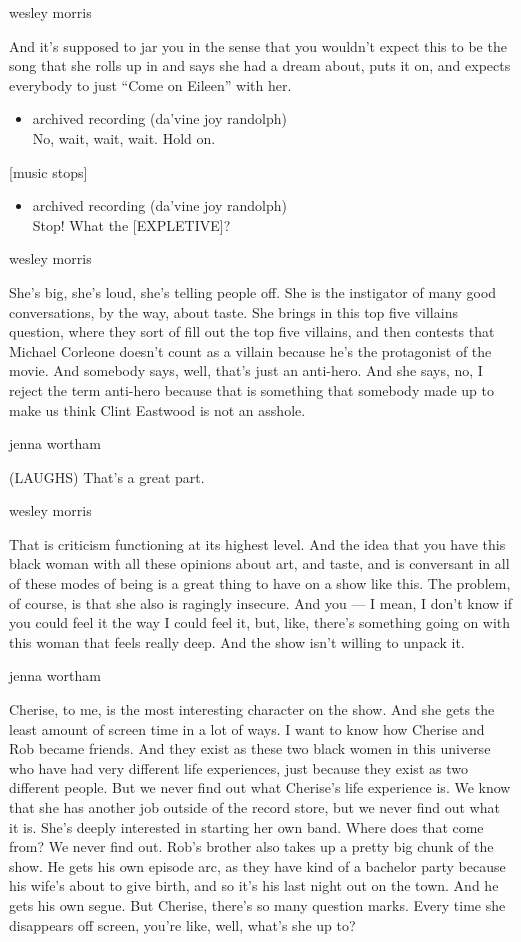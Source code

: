 wesley morris

And it's supposed to jar you in the sense that you wouldn't expect this
to be the song that she rolls up in and says she had a dream about, puts
it on, and expects everybody to just ``Come on Eileen'' with her.

\begin{itemize}
\tightlist
\item
  archived recording (da'vine joy randolph)\\
  No, wait, wait, wait. Hold on.
\end{itemize}

{[}music stops{]}

\begin{itemize}
\tightlist
\item
  archived recording (da'vine joy randolph)\\
  Stop! What the {[}EXPLETIVE{]}?
\end{itemize}

wesley morris

She's big, she's loud, she's telling people off. She is the instigator
of many good conversations, by the way, about taste. She brings in this
top five villains question, where they sort of fill out the top five
villains, and then contests that Michael Corleone doesn't count as a
villain because he's the protagonist of the movie. And somebody says,
well, that's just an anti-hero. And she says, no, I reject the term
anti-hero because that is something that somebody made up to make us
think Clint Eastwood is not an asshole.

jenna wortham

(LAUGHS) That's a great part.

wesley morris

That is criticism functioning at its highest level. And the idea that
you have this black woman with all these opinions about art, and taste,
and is conversant in all of these modes of being is a great thing to
have on a show like this. The problem, of course, is that she also is
ragingly insecure. And you --- I mean, I don't know if you could feel it
the way I could feel it, but, like, there's something going on with this
woman that feels really deep. And the show isn't willing to unpack it.

jenna wortham

Cherise, to me, is the most interesting character on the show. And she
gets the least amount of screen time in a lot of ways. I want to know
how Cherise and Rob became friends. And they exist as these two black
women in this universe who have had very different life experiences,
just because they exist as two different people. But we never find out
what Cherise's life experience is. We know that she has another job
outside of the record store, but we never find out what it is. She's
deeply interested in starting her own band. Where does that come from?
We never find out. Rob's brother also takes up a pretty big chunk of the
show. He gets his own episode arc, as they have kind of a bachelor party
because his wife's about to give birth, and so it's his last night out
on the town. And he gets his own segue. But Cherise, there's so many
question marks. Every time she disappears off screen, you're like, well,
what's she up to?

